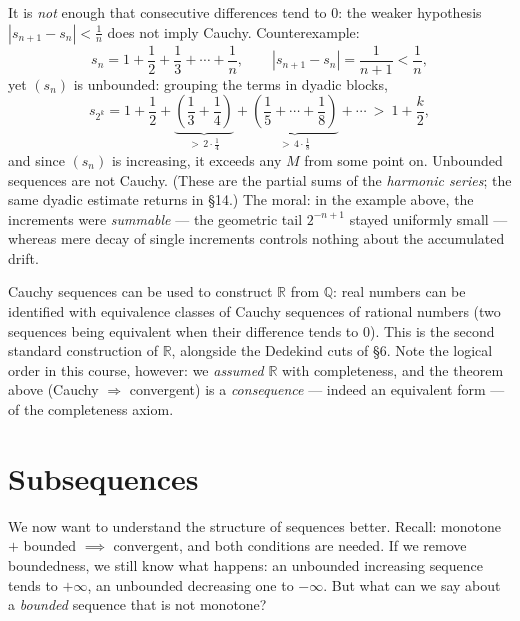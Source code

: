 \documentclass[11pt]{report}
\begin{document}
\begin{rembox}
It is \emph{not} enough that consecutive differences tend to $0$: the weaker hypothesis $|s_{n+1} - s_n| < \tfrac1n$ does not imply Cauchy. Counterexample:
\[
s_n = 1 + \frac12 + \frac13 + \cdots + \frac1n, \qquad |s_{n+1} - s_n| = \frac{1}{n+1} < \frac1n,
\]
yet $(s_n)$ is unbounded: grouping the terms in dyadic blocks,
\[
s_{2^k} = 1 + \frac12 + \underbrace{\left(\frac13 + \frac14\right)}_{>\, 2\cdot\frac14} + \underbrace{\left(\frac15 + \cdots + \frac18\right)}_{>\, 4\cdot\frac18} + \cdots \ >\ 1 + \frac k2,
\]
and since $(s_n)$ is increasing, it exceeds any $M$ from some point on. Unbounded sequences are not Cauchy. (These are the partial sums of the \emph{harmonic series}; the same dyadic estimate returns in \S 14.) The moral: in the example above, the increments were \emph{summable} --- the geometric tail $2^{-n+1}$ stayed uniformly small --- whereas mere decay of single increments controls nothing about the accumulated drift.
\end{rembox}

\begin{rembox}
Cauchy sequences can be used to construct $\mathbb{R}$ from $\mathbb{Q}$: real numbers can be identified with equivalence classes of Cauchy sequences of rational numbers (two sequences being equivalent when their difference tends to $0$). This is the second standard construction of $\mathbb{R}$, alongside the Dedekind cuts of \S 6. Note the logical order in this course, however: we \emph{assumed} $\mathbb{R}$ with completeness, and the theorem above (Cauchy $\Rightarrow$ convergent) is a \emph{consequence} --- indeed an equivalent form --- of the completeness axiom.
\end{rembox}


\section{Subsequences}

We now want to understand the structure of sequences better. Recall: monotone $+$ bounded $\implies$ convergent, and both conditions are needed. If we remove boundedness, we still know what happens: an unbounded increasing sequence tends to $+\infty$, an unbounded decreasing one to $-\infty$. But what can we say about a \emph{bounded} sequence that is not monotone?
\end{document}
